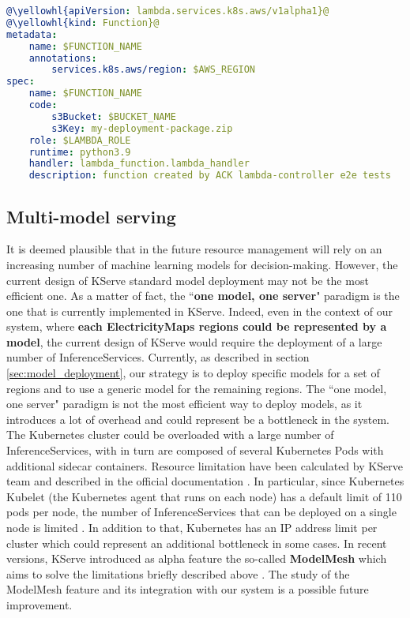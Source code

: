 \begin{lstlisting}[language=yaml, caption=AWS Lambda manifest example \cite{aws_lambda_ack}, label=lst:aws_lambda]
@\yellowhl{apiVersion: lambda.services.k8s.aws/v1alpha1}@
@\yellowhl{kind: Function}@
metadata:
    name: $FUNCTION_NAME
    annotations:
        services.k8s.aws/region: $AWS_REGION
spec:
    name: $FUNCTION_NAME
    code:
        s3Bucket: $BUCKET_NAME
        s3Key: my-deployment-package.zip
    role: $LAMBDA_ROLE
    runtime: python3.9
    handler: lambda_function.lambda_handler
    description: function created by ACK lambda-controller e2e tests
\end{lstlisting}

\subsection{Multi-model serving}

It is deemed plausible that in the future resource management will rely on an increasing number of machine learning models for decision-making.
However, the current design of KServe standard model deployment may not be the most efficient one.
As a matter of fact, the ``\textbf{one model, one server}" paradigm is the one that is currently implemented in KServe.
Indeed, even in the context of our system, where \textbf{each ElectricityMaps regions could be represented by a model}, the current design of KServe would require the deployment of a large number of InferenceServices.
Currently, as described in section \ref{sec:model_deployment}, our strategy is to deploy specific models for a set of regions and to use a generic model for the remaining regions.
The ``one model, one server" paradigm is not the most efficient way to deploy models, as it introduces a lot of overhead and could represent be a bottleneck in the system.
The Kubernetes cluster could be overloaded with a large number of InferenceServices, with in turn are composed of several Kubernetes Pods with additional sidecar containers.
Resource limitation have been calculated by KServe team and described in the official documentation \cite{kserve_multi_model}.
In particular, since Kubernetes Kubelet (the Kubernetes agent that runs on each node) has a default limit of 110 pods per node, the number of InferenceServices that can be deployed on a single node is limited \cite{kserve_multi_model}.
In addition to that, Kubernetes has an IP address limit per cluster which could represent an additional bottleneck in some cases.
In recent versions, KServe introduced as alpha feature the so-called \textbf{ModelMesh} which aims to solve the limitations briefly described above \cite{kserve_multi_model}.
The study of the ModelMesh feature and its integration with our system is a possible future improvement.


\newpage
